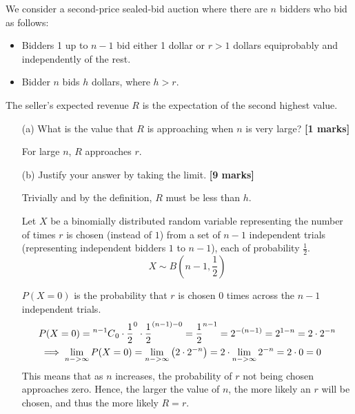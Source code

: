 
We consider a second-price sealed-bid auction where there are $n$ bidders who bid as follows:
\begin{itemize}
    \item Bidders 1 up to $n - 1$ bid either 1 dollar or $r > 1$ dollars equiprobably and
    independently of the rest.
    \item Bidder $n$ bids $h$ dollars, where $h > r$.
\end{itemize}
The seller's expected revenue $R$ is the expectation of the second highest value. 
\begin{itemize}
    \item[(a)] What is the value that $R$ is approaching when $n$ is very large? \hfill{\bf [1 marks]}\smallskip

    For large $n$, $R$ approaches $r$.

    \item[(b)] Justify your answer by taking the limit. \hfill{\bf [9 marks]}\smallskip

    Trivially and by the definition, $R$ must be less than $h$.

    Let $X$ be a binomially distributed random variable representing the number of times $r$ is chosen (instead of $1$) from a set of $n - 1$ independent trials (representing independent bidders $1$ to $n - 1$), each of probability $\frac{1}{2}$.
    \begin{equation}
        X \sim B{ \left( n - 1, \frac{1}{2} \right) }
    \end{equation}

    $P(X = 0)$ is the probability that $r$ is chosen $0$ times across the $n - 1$ independent trials.
    \begin{equation}
        \begin{split}
            & P(X = 0) = \ccomb[n - 1]{0} \cdot \frac{1}{2}^0 \cdot \frac{1}{2}^{(n - 1) - 0}
            = \frac{1}{2}^{n - 1} = 2^{-(n - 1)} = 2^{1 - n} = 2 \cdot 2^{-n} \\
            & \implies \lim_{n -> \infty}{P(X = 0)} = \lim_{n -> \infty}{ \left( 2 \cdot 2^{-n} \right) }
            = 2 \cdot \lim_{n -> \infty}{2^{-n}} = 2 \cdot 0 = 0
        \end{split}
    \end{equation}
    This means that as $n$ increases, the probability of $r$ not being chosen approaches zero.
    Hence, the larger the value of $n$, the more likely an $r$ will be chosen, and thus the more likely $R = r$.

\end{itemize}
